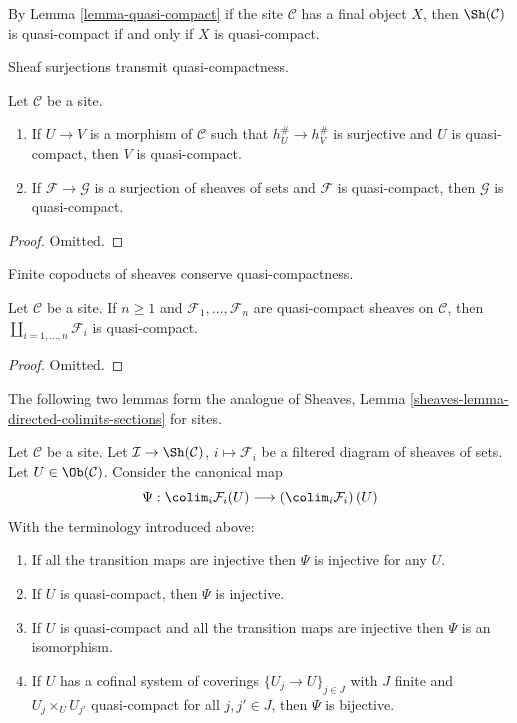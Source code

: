 \noindent
By Lemma \ref{lemma-quasi-compact}
if the site $\mathcal{C}$ has a final object $X$, then
$\Sh(\mathcal{C})$ is quasi-compact if and only if $X$ is quasi-compact.

\begin{lemma}
\label{lemma-image-of-quasi-compact}
\begin{slogan}
Sheaf surjections transmit quasi-compactness.
\end{slogan}
Let $\mathcal{C}$ be a site.
\begin{enumerate}
\item If $U \to V$ is a morphism of $\mathcal{C}$ such that
$h_U^\# \to h_V^\#$ is surjective and $U$ is quasi-compact, then
$V$ is quasi-compact.
\item If $\mathcal{F} \to \mathcal{G}$ is a surjection of sheaves
of sets and $\mathcal{F}$ is quasi-compact, then $\mathcal{G}$
is quasi-compact.
\end{enumerate}
\end{lemma}

\begin{proof}
Omitted.
\end{proof}

\begin{lemma}
\label{lemma-coproduct-quasi-compact}
\begin{slogan}
Finite copoducts of sheaves conserve quasi-compactness.
\end{slogan}
Let $\mathcal{C}$ be a site. If $n \geq 1$ and
$\mathcal{F}_1, \ldots, \mathcal{F}_n$ are quasi-compact
sheaves on $\mathcal{C}$, then $\coprod_{i = 1, \ldots, n} \mathcal{F}_i$
is quasi-compact.
\end{lemma}

\begin{proof}
Omitted.
\end{proof}

\noindent
The following two lemmas form the analogue of
Sheaves, Lemma \ref{sheaves-lemma-directed-colimits-sections}
for sites.

\begin{lemma}
\label{lemma-directed-colimits-sections}
Let $\mathcal{C}$ be a site. Let
$\mathcal{I} \to \Sh(\mathcal{C})$, $i \mapsto \mathcal{F}_i$
be a filtered diagram of sheaves of sets.
Let $U \in \Ob(\mathcal{C})$.
Consider the canonical map
$$
\Psi :
\colim_i \mathcal{F}_i(U)
\longrightarrow
\left(\colim_i \mathcal{F}_i\right)(U)
$$
With the terminology introduced above:
\begin{enumerate}
\item If all the transition maps are injective then
$\Psi$ is injective for any $U$.
\item If $U$ is quasi-compact, then $\Psi$ is injective.
\item If $U$ is quasi-compact and all the transition maps are injective
then $\Psi$ is an isomorphism.
\item If $U$ has a cofinal system of coverings
$\{U_j \to U\}_{j \in J}$ with
$J$ finite and $U_j \times_U U_{j'}$ quasi-compact
for all $j, j' \in J$, then $\Psi$ is bijective.
\end{enumerate}
\end{lemma}

